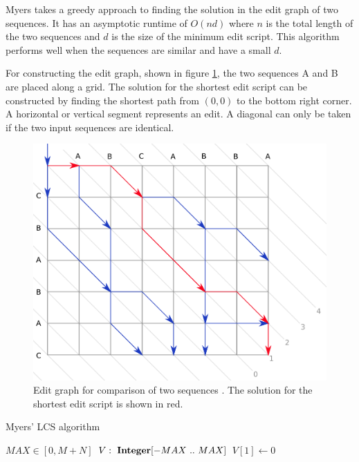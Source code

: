 Myers \cite{myers_anond_1986} takes a greedy approach to finding the solution in the edit graph of two sequences. It has an asymptotic runtime of $O(nd)$ where $n$ is the total length of the two sequences and $d$ is the size of the minimum edit script. This algorithm performs well when the sequences are similar and have a small $d$.

For constructing the edit graph, shown in figure \ref{edit_graph}, the two sequences A and B are placed along a grid. The solution for the shortest edit script can be constructed by finding the shortest path from $(0,0)$ to the bottom right corner. A horizontal or vertical segment represents an edit. A diagonal can only be taken if the two input sequences are identical.

\begin{figure}[hbt]\centering
  \includegraphics[width=0.9\linewidth]{images/edit-graph.pdf}
  \caption{Edit graph for comparison of two sequences \cite{edit_graph}. The solution for the shortest edit script is shown in red.
}
  \label{edit_graph}
\end{figure}

\begin{algorithm}
\caption{Myers' LCS algorithm \cite{myers_anond_1986}}
\label{myers_algorithm}
\SetAlgoNoLine
\SetAlgoNoEnd
\DontPrintSemicolon
\scriptsize       %

 $MAX \in [0, M+N]$\;
$V:\ \KwSty{Integer}[-MAX\ ..\ MAX]$\;
\;
$V[1]\leftarrow 0$\;
\end{algorithm}

